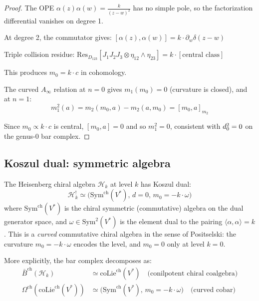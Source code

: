 \begin{proof}
The OPE $\alpha(z)\alpha(w) = \frac{k}{(z-w)^2}$ has no simple pole, so the factorization differential vanishes on degree 1.

At degree 2, the commutator gives:
$[\alpha(z), \alpha(w)] = k \cdot \partial_w\delta(z-w)$

Triple collision residue:
$\text{Res}_{D_{123}}[J_1 J_2 J_3 \otimes \eta_{12} \wedge \eta_{23}] = k \cdot [\text{central class}]$

This produces $m_0 = k \cdot c$ in cohomology.

The curved $A_\infty$ relation at $n = 0$ gives $m_1(m_0) = 0$ (curvature is closed), and at $n = 1$:
\[m_1^2(a) = m_2(m_0, a) - m_2(a, m_0) = [m_0, a]_{m_2}\]

Since $m_0 \propto k \cdot c$ is central, $[m_0, a] = 0$ and so $m_1^2 = 0$, consistent with $d_0^2 = 0$ on the genus-$0$ bar complex.
\end{proof}


\subsection{Koszul dual: symmetric algebra}

\begin{theorem}\label{thm:heisenberg-koszul-dual-early}
The Heisenberg chiral algebra $\mathcal{H}_k$ at level $k$ has Koszul dual:
\[\mathcal{H}_k^! \simeq \bigl(\mathrm{Sym}^{\mathrm{ch}}(V^*),\, d = 0,\, m_0 = -k \cdot \omega\bigr)\]
where $\mathrm{Sym}^{\mathrm{ch}}(V^*)$ is the chiral symmetric (commutative) algebra on the dual generator space, and $\omega \in \mathrm{Sym}^2(V^*)$ is the element dual to the pairing $\langle \alpha, \alpha \rangle = k$. This is a \emph{curved} commutative chiral algebra in the sense of Positselski: the curvature $m_0 = -k \cdot \omega$ encodes the level, and $m_0 = 0$ only at level $k = 0$.

More explicitly, the bar complex decomposes as:
\begin{align}
\bar{B}^{\mathrm{ch}}(\mathcal{H}_k) &\simeq \mathrm{coLie}^{\mathrm{ch}}(V^*) \quad \text{(conilpotent chiral coalgebra)} \\
\Omega^{\mathrm{ch}}(\mathrm{coLie}^{\mathrm{ch}}(V^*)) &\simeq \bigl(\mathrm{Sym}^{\mathrm{ch}}(V^*),\, m_0 = -k \cdot \omega\bigr) \quad \text{(curved cobar)}
\end{align}
\end{theorem}

